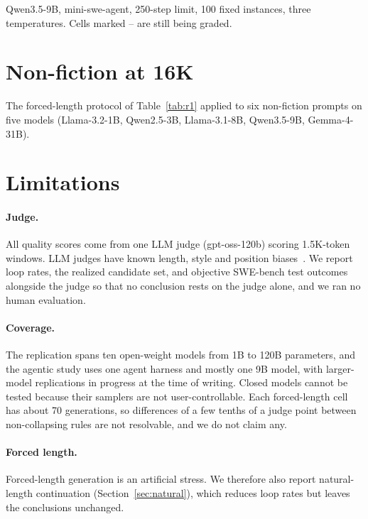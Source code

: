 \documentclass{article}
\begin{document}
Qwen3.5-9B, mini-swe-agent, 250-step limit, 100 fixed instances, three temperatures. Cells marked -- are still being graded.

\begin{table}[h]
\centering
\small

\end{table}

\section{Non-fiction at 16K}
\label{app:nonfic}

The forced-length protocol of Table~\ref{tab:r1} applied to six non-fiction prompts on five models (Llama-3.2-1B, Qwen2.5-3B, Llama-3.1-8B, Qwen3.5-9B, Gemma-4-31B).

\begin{table}[h]
\centering
\small

\end{table}


\section{Limitations}
\label{sec:limitations}

\paragraph{Judge.}
All quality scores come from one LLM judge (gpt-oss-120b) scoring 1.5K-token windows. LLM judges have known length, style and position biases~\citep{zheng2023judging}. We report loop rates, the realized candidate set, and objective SWE-bench test outcomes alongside the judge so that no conclusion rests on the judge alone, and we ran no human evaluation.

\paragraph{Coverage.}
The replication spans ten open-weight models from 1B to 120B parameters, and the agentic study uses one agent harness and mostly one 9B model, with larger-model replications in progress at the time of writing. Closed models cannot be tested because their samplers are not user-controllable. Each forced-length cell has about 70 generations, so differences of a few tenths of a judge point between non-collapsing rules are not resolvable, and we do not claim any.

\paragraph{Forced length.}
Forced-length generation is an artificial stress. We therefore also report natural-length continuation (Section~\ref{sec:natural}), which reduces loop rates but leaves the conclusions unchanged.
\end{document}
